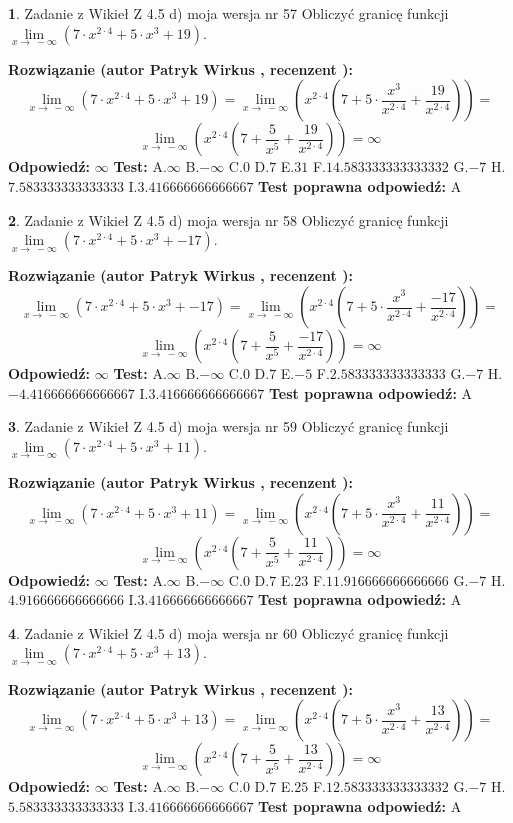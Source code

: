 \documentclass[12pt, a4paper]{article}
\theoremstyle{definition} %
\newtheorem{zad}{}
\newcommand{\zadStart}[1]{\begin{zad}#1\newline}
\newcommand{\zadStop}{\end{zad}}
\newcommand{\rozwStart}[2]{\noindent \textbf{Rozwiązanie (autor #1 , recenzent #2): }\newline}
\newcommand{\rozwStop}{\newline}
\newcommand{\odpStart}{\noindent \textbf{Odpowiedź:}\newline}
\newcommand{\odpStop}{\newline}
\newcommand{\testStart}{\noindent \textbf{Test:}\newline}
\newcommand{\testStop}{\newline}
\newcommand{\kluczStart}{\noindent \textbf{Test poprawna odpowiedź:}\newline}
\newcommand{\kluczStop}{\newline}
\begin{document}
\zadStart{Zadanie z Wikieł Z 4.5 d) moja wersja nr 57}
Obliczyć granicę funkcji  $\lim\limits_{x\to\ -\infty}(7 \cdot x^{2\cdot4}+5 \cdot x^{3}+19)$.
\zadStop
\rozwStart{Patryk Wirkus}{}
$$\lim\limits_{x\to\ -\infty}(7 \cdot x^{2\cdot4}+5 \cdot x^{3}+19) = \lim\limits_{x\to\ -\infty}(x^{2\cdot4}(7 +5 \cdot \frac{x^{3}}{x^{2\cdot4}}+\frac{19}{x^{2\cdot4}})) =$$ $$\lim\limits_{x\to\ -\infty}(x^{2\cdot4}(7 +\frac{5}{x^{5}}+\frac{19}{x^{2\cdot4}})) =\infty$$
\rozwStop
\odpStart
$\infty$
\odpStop
\testStart
A.$\infty$ B.$-\infty$ C.$0$ D.$7$ E.$31$
F.$14.583333333333332$ G.$-7$
H.$7.583333333333333$
I.$3.416666666666667$
\testStop
\kluczStart
A
\kluczStop



\zadStart{Zadanie z Wikieł Z 4.5 d) moja wersja nr 58}
Obliczyć granicę funkcji  $\lim\limits_{x\to\ -\infty}(7 \cdot x^{2\cdot4}+5 \cdot x^{3}+-17)$.
\zadStop
\rozwStart{Patryk Wirkus}{}
$$\lim\limits_{x\to\ -\infty}(7 \cdot x^{2\cdot4}+5 \cdot x^{3}+-17) = \lim\limits_{x\to\ -\infty}(x^{2\cdot4}(7 +5 \cdot \frac{x^{3}}{x^{2\cdot4}}+\frac{-17}{x^{2\cdot4}})) =$$ $$\lim\limits_{x\to\ -\infty}(x^{2\cdot4}(7 +\frac{5}{x^{5}}+\frac{-17}{x^{2\cdot4}})) =\infty$$
\rozwStop
\odpStart
$\infty$
\odpStop
\testStart
A.$\infty$ B.$-\infty$ C.$0$ D.$7$ E.$-5$
F.$2.583333333333333$ G.$-7$
H.$-4.416666666666667$
I.$3.416666666666667$
\testStop
\kluczStart
A
\kluczStop



\zadStart{Zadanie z Wikieł Z 4.5 d) moja wersja nr 59}
Obliczyć granicę funkcji  $\lim\limits_{x\to\ -\infty}(7 \cdot x^{2\cdot4}+5 \cdot x^{3}+11)$.
\zadStop
\rozwStart{Patryk Wirkus}{}
$$\lim\limits_{x\to\ -\infty}(7 \cdot x^{2\cdot4}+5 \cdot x^{3}+11) = \lim\limits_{x\to\ -\infty}(x^{2\cdot4}(7 +5 \cdot \frac{x^{3}}{x^{2\cdot4}}+\frac{11}{x^{2\cdot4}})) =$$ $$\lim\limits_{x\to\ -\infty}(x^{2\cdot4}(7 +\frac{5}{x^{5}}+\frac{11}{x^{2\cdot4}})) =\infty$$
\rozwStop
\odpStart
$\infty$
\odpStop
\testStart
A.$\infty$ B.$-\infty$ C.$0$ D.$7$ E.$23$
F.$11.916666666666666$ G.$-7$
H.$4.916666666666666$
I.$3.416666666666667$
\testStop
\kluczStart
A
\kluczStop



\zadStart{Zadanie z Wikieł Z 4.5 d) moja wersja nr 60}
Obliczyć granicę funkcji  $\lim\limits_{x\to\ -\infty}(7 \cdot x^{2\cdot4}+5 \cdot x^{3}+13)$.
\zadStop
\rozwStart{Patryk Wirkus}{}
$$\lim\limits_{x\to\ -\infty}(7 \cdot x^{2\cdot4}+5 \cdot x^{3}+13) = \lim\limits_{x\to\ -\infty}(x^{2\cdot4}(7 +5 \cdot \frac{x^{3}}{x^{2\cdot4}}+\frac{13}{x^{2\cdot4}})) =$$ $$\lim\limits_{x\to\ -\infty}(x^{2\cdot4}(7 +\frac{5}{x^{5}}+\frac{13}{x^{2\cdot4}})) =\infty$$
\rozwStop
\odpStart
$\infty$
\odpStop
\testStart
A.$\infty$ B.$-\infty$ C.$0$ D.$7$ E.$25$
F.$12.583333333333332$ G.$-7$
H.$5.583333333333333$
I.$3.416666666666667$
\testStop
\kluczStart
A
\kluczStop
\end{document}
